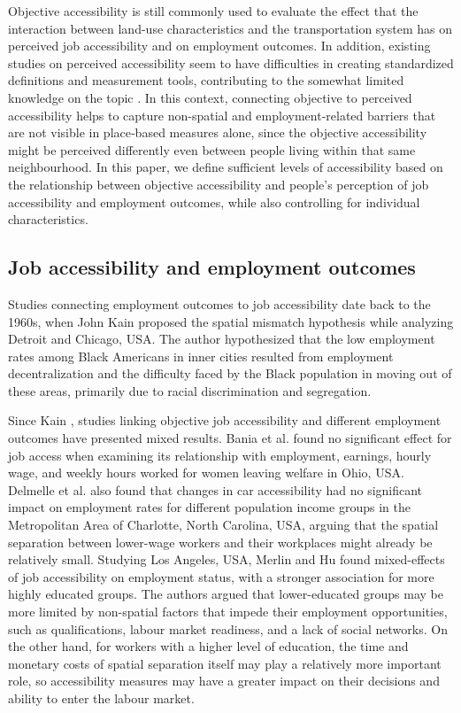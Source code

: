 \documentclass[preprint, 3p,
authoryear]{elsarticle} %
\begin{document}
Objective accessibility is still commonly used to evaluate the effect
that the interaction between land-use characteristics and the
transportation system has on perceived job accessibility and on
employment outcomes. In addition, existing studies on perceived
accessibility seem to have difficulties in creating standardized
definitions and measurement tools, contributing to the somewhat limited
knowledge on the topic \citep{negm2025}. In this context, connecting
objective to perceived accessibility helps to capture non-spatial and
employment‑related barriers that are not visible in place‑based measures
alone, since the objective accessibility might be perceived differently
even between people living within that same neighbourhood. In this
paper, we define sufficient levels of accessibility based on the
relationship between objective accessibility and people's perception of
job accessibility and employment outcomes, while also controlling for
individual characteristics.

\subsection{Job accessibility and employment
outcomes}\label{job-accessibility-and-employment-outcomes}

Studies connecting employment outcomes to job accessibility date back to
the 1960s, when John Kain \citeyearpar{kain1968} proposed the spatial
mismatch hypothesis while analyzing Detroit and Chicago, USA. The author
hypothesized that the low employment rates among Black Americans in
inner cities resulted from employment decentralization and the
difficulty faced by the Black population in moving out of these areas,
primarily due to racial discrimination and segregation.

Since Kain \citeyearpar{kain1968}, studies linking objective job
accessibility and different employment outcomes have presented mixed
results. Bania et al. \citeyearpar{bania2008} found no significant
effect for job access when examining its relationship with employment,
earnings, hourly wage, and weekly hours worked for women leaving welfare
in Ohio, USA. Delmelle et al. \citeyearpar{delmelle2021} also found that
changes in car accessibility had no significant impact on employment
rates for different population income groups in the Metropolitan Area of
Charlotte, North Carolina, USA, arguing that the spatial separation
between lower-wage workers and their workplaces might already be
relatively small. Studying Los Angeles, USA, Merlin and Hu
\citeyearpar{merlin2017} found mixed-effects of job accessibility on
employment status, with a stronger association for more highly educated
groups. The authors argued that lower-educated groups may be more
limited by non-spatial factors that impede their employment
opportunities, such as qualifications, labour market readiness, and a
lack of social networks. On the other hand, for workers with a higher
level of education, the time and monetary costs of spatial separation
itself may play a relatively more important role, so accessibility
measures may have a greater impact on their decisions and ability to
enter the labour market.
\end{document}
